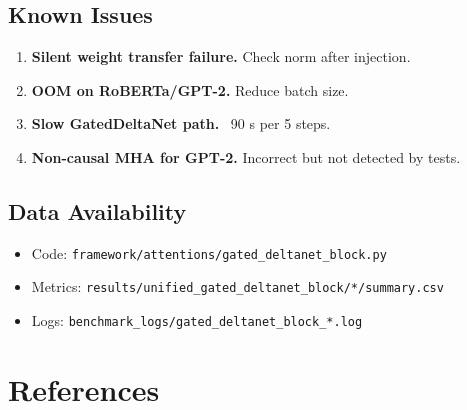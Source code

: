 \subsection{Known Issues}

\begin{enumerate}
\item \textbf{Silent weight transfer failure.} Check norm after injection.
\item \textbf{OOM on RoBERTa/GPT-2.} Reduce batch size.
\item \textbf{Slow GatedDeltaNet path.} ~90 s per 5 steps.
\item \textbf{Non-causal MHA for GPT-2.} Incorrect but not detected by tests.

\end{enumerate}
\subsection{Data Availability}

\begin{itemize}
\item Code: \texttt{framework/attentions/gated\_deltanet\_block.py}
\item Metrics: \texttt{results/unified\_gated\_deltanet\_block/*/summary.csv}
\item Logs: \texttt{benchmark\_logs/gated\_deltanet\_block\_*.log}

\end{itemize}



\section{References}


